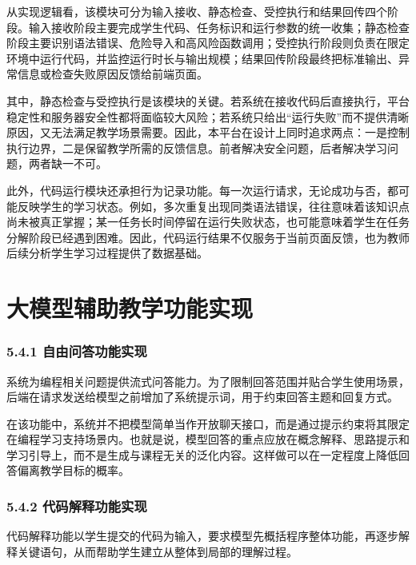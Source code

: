 \tikzCodeRunSequenceFigure

从实现逻辑看，该模块可分为输入接收、静态检查、受控执行和结果回传四个阶段。输入接收阶段主要完成学生代码、任务标识和运行参数的统一收集；静态检查阶段主要识别语法错误、危险导入和高风险函数调用；受控执行阶段则负责在限定环境中运行代码，并监控运行时长与输出规模；结果回传阶段最终把标准输出、异常信息或检查失败原因反馈给前端页面。

其中，静态检查与受控执行是该模块的关键。若系统在接收代码后直接执行，平台稳定性和服务器安全性都将面临较大风险；若系统只给出``运行失败''而不提供清晰原因，又无法满足教学场景需要。因此，本平台在设计上同时追求两点：一是控制执行边界，二是保留教学所需的反馈信息。前者解决安全问题，后者解决学习问题，两者缺一不可。

此外，代码运行模块还承担行为记录功能。每一次运行请求，无论成功与否，都可能反映学生的学习状态。例如，多次重复出现同类语法错误，往往意味着该知识点尚未被真正掌握；某一任务长时间停留在运行失败状态，也可能意味着学生在任务分解阶段已经遇到困难。因此，代码运行结果不仅服务于当前页面反馈，也为教师后续分析学生学习过程提供了数据基础。

\section{大模型辅助教学功能实现}\label{ux5927ux6a21ux578bux8f85ux52a9ux6559ux5b66ux529fux80fdux5b9eux73b0}

\subsubsection{5.4.1 自由问答功能实现}\label{ux81eaux7531ux95eeux7b54ux529fux80fdux5b9eux73b0}

系统为编程相关问题提供流式问答能力。为了限制回答范围并贴合学生使用场景，后端在请求发送给模型之前增加了系统提示词，用于约束回答主题和回复方式。

在该功能中，系统并不把模型简单当作开放聊天接口，而是通过提示约束将其限定在编程学习支持场景内。也就是说，模型回答的重点应放在概念解释、思路提示和学习引导上，而不是生成与课程无关的泛化内容。这样做可以在一定程度上降低回答偏离教学目标的概率。

\subsubsection{5.4.2 代码解释功能实现}\label{ux4ee3ux7801ux89e3ux91caux529fux80fdux5b9eux73b0}

代码解释功能以学生提交的代码为输入，要求模型先概括程序整体功能，再逐步解释关键语句，从而帮助学生建立从整体到局部的理解过程。

